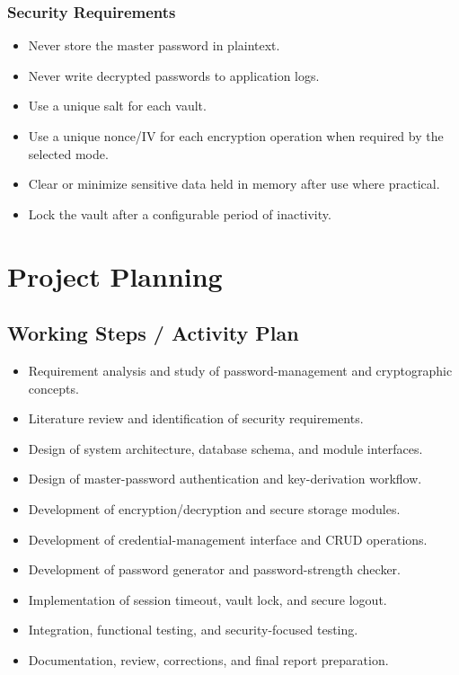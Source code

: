 \documentclass[12pt,a4paper,oneside]{report}
\begin{document}
\subsection{Security Requirements}

\begin{itemize}
\item Never store the master password in plaintext.
\item Never write decrypted passwords to application logs.
\item Use a unique salt for each vault.
\item Use a unique nonce/IV for each encryption operation when required by the selected mode.
\item Clear or minimize sensitive data held in memory after use where practical.
\item Lock the vault after a configurable period of inactivity.
\end{itemize}


\chapter{Project Planning}

\section{Working Steps / Activity Plan}

\begin{itemize}
\item Requirement analysis and study of password-management and cryptographic concepts.
\item Literature review and identification of security requirements.
\item Design of system architecture, database schema, and module interfaces.
\item Design of master-password authentication and key-derivation workflow.
\item Development of encryption/decryption and secure storage modules.
\item Development of credential-management interface and CRUD operations.
\item Development of password generator and password-strength checker.
\item Implementation of session timeout, vault lock, and secure logout.
\item Integration, functional testing, and security-focused testing.
\item Documentation, review, corrections, and final report preparation.
\end{itemize}
\end{document}
